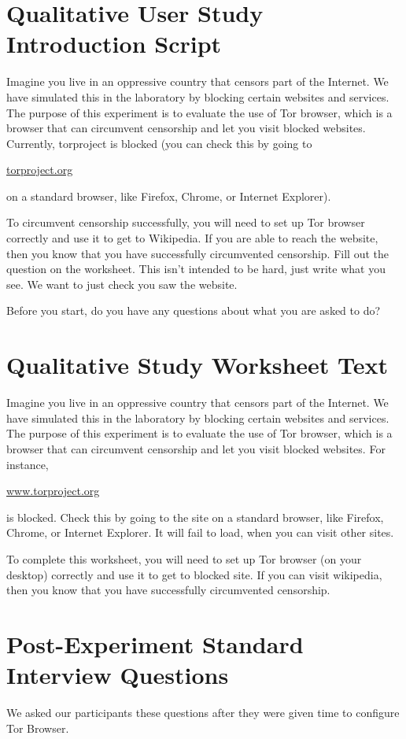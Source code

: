 \documentclass[USenglish,oneside,twocolumn]{article}
\begin{document}
\section{Qualitative User Study Introduction Script} 
\label{qualitative-script} 
Imagine you live in an oppressive country that censors part of the Internet. We have simulated this in the laboratory by blocking certain websites and services.  The purpose of this experiment is to evaluate the use of Tor browser, which is a browser that can circumvent censorship and let you visit blocked websites. Currently, torproject is blocked (you can check this by going to \begin{NoHyper}\url{torproject.org}\end{NoHyper} on a standard browser, like Firefox, Chrome, or Internet Explorer). 

To circumvent censorship successfully, you will need to set up Tor browser correctly and use it to get to Wikipedia. If you are able to reach the website, then you know that you have successfully circumvented censorship. Fill out the question on the worksheet. This isn't intended to be hard, just write what you see. We want to just check you saw the website. 

Before you start, do you have any questions about what you are asked to do? 

\section{Qualitative Study Worksheet Text} 
\label{participant-worksheet}
Imagine you live in an oppressive country that censors part of the Internet. We have simulated this in the laboratory by blocking certain websites and services. The purpose of this experiment is to evaluate the use of Tor browser, which is a browser that can circumvent censorship and let you visit blocked websites. For instance, \begin{NoHyper}\url{www.torproject.org}\end{NoHyper} is blocked. Check this by going to the site on a standard browser, like Firefox, Chrome, or Internet Explorer. It will fail to load, when you can visit other sites.

To complete this worksheet, you will need to set up Tor browser (on your desktop) correctly and use it to get to blocked site. If you can visit wikipedia, then you know that you have successfully circumvented censorship.

\section{Post-Experiment Standard Interview Questions}
\label{interview-questions}
We asked our participants these questions after they were given time to configure Tor Browser. \\
\end{document}
